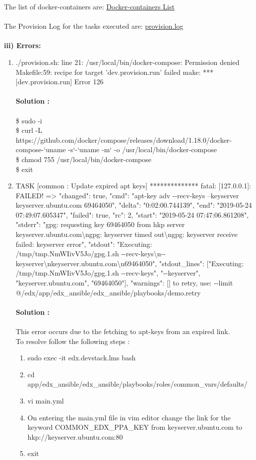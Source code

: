 \documentclass[12pt]{report}
\begin{document}
The list of docker-containers are: \href{https://drive.google.com/open?id=0B168SrnPp4BpZ1RCQ1VncU81VEZYanl2SUNWN2dtRUg1bGRv}{Docker-containers List}
\\\\
The Provision Log for the tasks executed are: \href{https://drive.google.com/open?id=0B168SrnPp4BpclQ3d3gwbDNWLWtrUzduYUt6Vko4S2h6bzBz}{provision.log}\\\\
\textbf{iii) Errors:}
\begin{enumerate}
	\item  ./provision.sh: line 21: /usr/local/bin/docker-compose: Permission denied
	Makefile:59: recipe for target 'dev.provision.run' failed
	make: *** [dev.provision.run] Error 126\\\\
	\textbf{Solution :}\\\\
	\$ sudo -i\\
	\$ curl -L https://github.com/docker/compose/releases/download/1.18.0/docker-compose-`uname -s`-`uname -m` -o /usr/local/bin/docker-compose\\
	\$ chmod 755 /usr/local/bin/docker-compose\\
	\$ exit
	\item TASK [common : Update expired apt keys] **************
	fatal: [127.0.0.1]: FAILED! => {"changed": true, "cmd": "apt-key adv -{}-recv-keys --keyserver keyserver.ubuntu.com 69464050", "delta": "0:02:00.744139", "end": "2019-05-24 07:49:07.605347", "failed": true, "rc": 2, "start": "2019-05-24 07:47:06.861208", "stderr": "gpg: requesting key 69464050 from hkp server keyserver.ubuntu.com\textbackslash ngpg: keyserver timed out\textbackslash ngpg: keyserver receive failed: keyserver error", "stdout": "Executing: /tmp/tmp.NmWIivV5Jo/gpg.1.sh -{}-recv-keys\textbackslash n-{}-keyserver\textbackslash nkeyserver.ubuntu.com\textbackslash n69464050", "stdout\_lines": ["Executing: /tmp/tmp.NmWIivV5Jo/gpg.1.sh -{}-recv-keys", "-{}-keyserver", "keyserver.ubuntu.com", "69464050"], "warnings": []}
	to retry, use: -{}-limit @/edx/app/edx\_ansible/edx\_ansible/playbooks/demo.retry\\\\
	\textbf{Solution :}\\\\
	This error occurs due to the fetching to apt-keys from an expired link.\\
	To resolve follow the following steps :
	\begin{enumerate}
		\item sudo exec -it edx.devstack.lms bash
		\item cd app/edx\_ansible/edx\_ansible/playbooks/roles/common\_vars/defaults/
		\item vi main.yml
		\item On entering the main.yml file in vim editor change the link for the keyword 
		COMMON\_EDX\_PPA\_KEY from keyserver.ubuntu.com to  hkp://keyserver.ubuntu.com:80
		\item exit
	\end{enumerate}
\end{enumerate}
\end{document}
